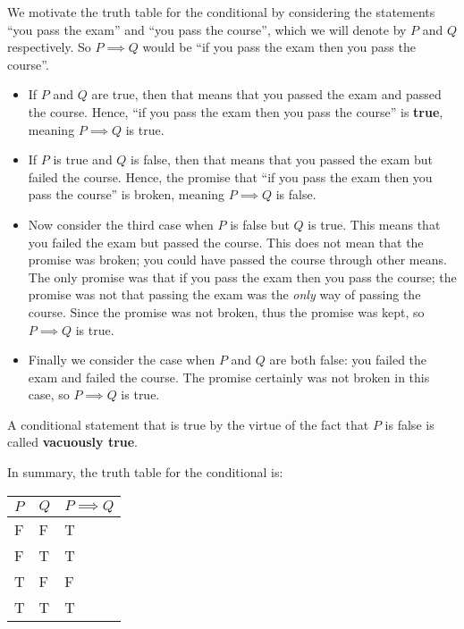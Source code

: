 We motivate the truth table for the conditional by considering the statements ``you pass the exam'' and ``you pass the course'', which we will denote by $P$ and $Q$ respectively. So $P \implies Q$ would be ``if you pass the exam then you pass the course''.
\begin{itemize}
    \item If $P$ and $Q$ are true, then that means that you passed the exam and passed the course. Hence, ``if you pass the exam then you pass the course'' is \textbf{true}, meaning $P \implies Q$ is true.
    \item If $P$ is true and $Q$ is false, then that means that you passed the exam but failed the course. Hence, the promise that ``if you pass the exam then you pass the course'' is broken, meaning $P \implies Q$ is false.
    \item Now consider the third case when $P$ is false but $Q$ is true. This means that you failed the exam but passed the course. This does not mean that the promise was broken; you could have passed the course through other means. The only promise was that if you pass the exam then you pass the course; the promise was not that passing the exam was the \textit{only} way of passing the course. Since the promise was not broken, thus the promise was kept, so $P \implies Q$ is true.
    \item Finally we consider the case when $P$ and $Q$ are both false: you failed the exam and failed the course. The promise certainly was not broken in this case, so $P \implies Q$ is true.
\end{itemize}
\begin{remark}
    A conditional statement that is true by the virtue of the fact that $P$ is false is called \textbf{vacuously true}.
\end{remark}

In summary, the truth table for the conditional is:
\begin{table}[h]
    \centering
    \begin{tabular}{|l|l||l|}
        \hline
        $P$ & $Q$ & $P\implies Q$ \\ \hline
        F   & F   & T             \\ \hline
        F   & T   & T             \\ \hline
        T   & F   & F             \\ \hline
        T   & T   & T             \\ \hline
    \end{tabular}
\end{table}

